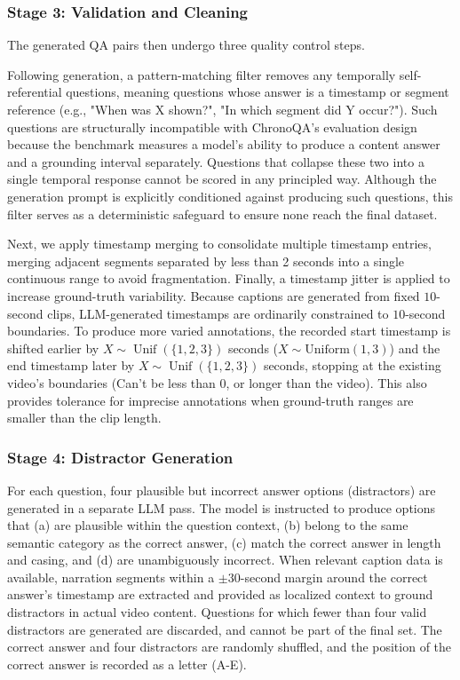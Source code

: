 \documentclass[sigconf,natbib=false,nonacm]{acmart}
\begin{document}
\subsubsection{Stage 3: Validation and Cleaning}

The generated QA pairs then undergo three quality control steps.

Following generation, a pattern-matching filter removes any temporally self-referential questions, meaning questions whose answer is a timestamp or segment reference (e.g., "When was X shown?", "In which segment did Y occur?"). Such questions are structurally incompatible with ChronoQA's evaluation design because the benchmark measures a model's ability to produce a content answer and a grounding interval separately. Questions that collapse these two into a single temporal response cannot be scored in any principled way. Although the generation prompt is explicitly conditioned against producing such questions, this filter serves as a deterministic safeguard to ensure none reach the final dataset.

Next, we apply timestamp merging to consolidate multiple timestamp entries, merging adjacent segments separated by less than 2 seconds into a single continuous range to avoid fragmentation. Finally, a timestamp jitter is applied to increase ground-truth variability. Because captions are generated from fixed $10$-second clips, LLM-generated timestamps are ordinarily constrained to $10$-second boundaries. To produce more varied annotations, the recorded start timestamp is shifted earlier by $X \sim \operatorname{Unif}(\{1, 2, 3\})$ seconds ($X \sim \text{Uniform}(1, 3)$) and the end timestamp later by $X \sim \operatorname{Unif}(\{1, 2, 3\})$ seconds, stopping at the existing video's boundaries (Can't be less than 0, or longer than the video). This also provides tolerance for imprecise annotations when ground-truth ranges are smaller than the clip length. 

\subsubsection{Stage 4: Distractor Generation}

For each question, four plausible but incorrect answer options (distractors) are generated in a separate LLM pass. The model is instructed to produce options that (a) are plausible within the question context, (b) belong to the same semantic category as the correct answer, (c) match the correct answer in length and casing, and (d) are unambiguously incorrect. When relevant caption data is available, narration segments within a $\pm30$-second margin around the correct answer's timestamp are extracted and provided as localized context to ground distractors in actual video content. Questions for which fewer than four valid distractors are generated are discarded, and cannot be part of the final set. The correct answer and four distractors are randomly shuffled, and the position of the correct answer is recorded as a letter (A-E).
\end{document}
